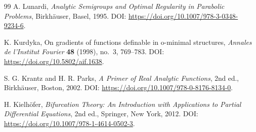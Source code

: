 \documentclass[11pt]{article}
\numberwithin{equation}{section}
\begin{document}
\begin{thebibliography}{99}
A. Lunardi,
\emph{Analytic Semigroups and Optimal Regularity in Parabolic Problems},
Birkh\"auser, Basel, 1995.
DOI: \url{https://doi.org/10.1007/978-3-0348-9234-6}.


K. Kurdyka,
On gradients of functions definable in o-minimal structures,
\emph{Annales de l'Institut Fourier} \textbf{48} (1998), no.~3, 769--783.
DOI: \url{https://doi.org/10.5802/aif.1638}.

S. G. Krantz and H. R. Parks,
\emph{A Primer of Real Analytic Functions}, 2nd ed.,
Birkh\"auser, Boston, 2002.
DOI: \url{https://doi.org/10.1007/978-0-8176-8134-0}.


H. Kielh\"ofer,
\emph{Bifurcation Theory: An Introduction with Applications to Partial Differential Equations},
2nd ed., Springer, New York, 2012.
DOI: \url{https://doi.org/10.1007/978-1-4614-0502-3}.

\end{thebibliography}
\end{document}
